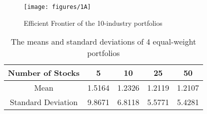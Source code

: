 \documentclass{report}
\begin{document}
\begin{figure}[H]
	\centering
	\texttt{[image: figures/1A]}
	\caption{Efficient Frontier of the 10-industry portfolios}
\end{figure}



\begin{table}[H]
	\centering
	\caption{The means and standard deviations of 4 equal-weight portfolios}
	\begin{tabular}{ccccc}\hline\hline
	Number of Stocks & 5 & 10 & 25 & 50 \\\hline
	Mean & 1.5164 & 1.2326 & 1.2119 & 1.2107 \\
	Standard Deviation & 9.8671 & 6.8118 & 5.5771 & 5.4281 \\ \hline
	\end{tabular}
\end{table}
\end{document}
